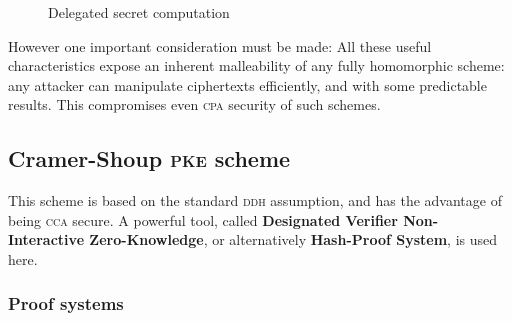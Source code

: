 \begin{figure}[h!]
    \centering
    \sdinit{}
    \caption{Delegated secret computation}
    \label{seq:delseccomp}
\end{figure}

However one important consideration must be made: All these useful characteristics expose an inherent malleability of any fully homomorphic scheme: any attacker can manipulate ciphertexts efficiently, and with some predictable results. This compromises even \textsc{cpa} security of such schemes.

\subsection{Cramer-Shoup \textsc{pke} scheme}

This scheme is based on the standard \textsc{ddh} assumption, and has the advantage of being \textsc{cca} secure. A powerful tool, called \textbf{Designated Verifier Non-Interactive Zero-Knowledge}, or alternatively \textbf{Hash-Proof System}, is used here.

\subsubsection{Proof systems}

